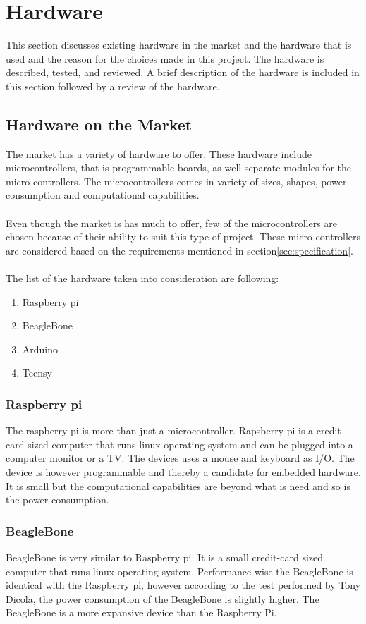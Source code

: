 \section{Hardware}
This section discusses existing hardware in the market and the hardware that is used and the reason for the choices made in this project.  The hardware is
described, tested, and reviewed. A brief description of the hardware is included
in this section followed by a review of the hardware.
\subsection{Hardware on the Market}
The market has a variety of hardware to offer. These hardware include microcontrollers, that is programmable boards, as well separate modules for the micro controllers. The microcontrollers comes in variety of sizes, shapes, power consumption and computational capabilities.
\\\\
Even though the market is has much to offer, few of the microcontrollers are chosen because of their ability to suit this type of project. These micro-controllers are  considered based on the requirements mentioned in section\ref{sec:specification}.
\\\\The list of the hardware taken into consideration are following:
\begin{enumerate}
  \item Raspberry pi
  \item BeagleBone
  \item Arduino
  \item Teensy
\end{enumerate}
\subsubsection{Raspberry pi}
The raspberry pi is more than just a microcontroller. Rapsberry pi is a credit-card sized computer that runs linux operating system and can be plugged into a computer monitor or a TV. The devices uses a mouse and keyboard as I/O. The device is however programmable and thereby a candidate for embedded hardware. It is small but the computational capabilities are beyond what is need and so is the power consumption\cite{power_usage}. 

\subsubsection{BeagleBone}
BeagleBone is very similar to Raspberry pi. It is a small credit-card sized computer that runs linux operating system. Performance-wise the BeagleBone is identical with the Raspberry pi, however according to the test performed by Tony Dicola\cite{power_usage}, the power consumption of the BeagleBone is slightly higher. The BeagleBone is a more expansive device than the Raspberry Pi.

